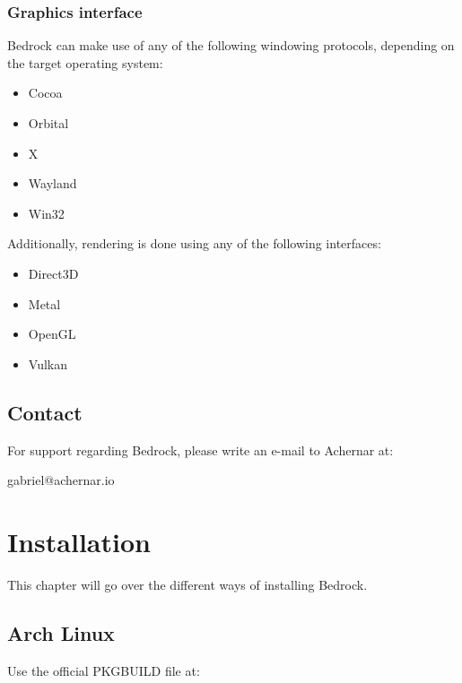 \documentclass[a5paper, twoside]{report}
\begin{document}
			\subsection{Graphics interface}
				Bedrock can make use of any of the following windowing protocols, depending on the target operating system:

				\begin{multicols}{2}
					\begin{itemize}
						\item{Cocoa}
						\item{Orbital}
						\item{X}
						\item{Wayland}
						\item{Win32}
					\end{itemize}
				\end{multicols}

				Additionally, rendering is done using any of the following interfaces:

				\begin{multicols}{2}
					\begin{itemize}
						\item{Direct3D}
						\item{Metal}
						\item{OpenGL}
						\item{Vulkan}
					\end{itemize}
				\end{multicols}

		\section{Contact}
			For support regarding Bedrock, please write an e-mail to Achernar at:

			\begin{mdframed}
				\ttfamily
				gabriel@achernar.io
			\end{mdframed}

	\clearpage
	\chapter{Installation}
		This chapter will go over the different ways of installing Bedrock.

		\section{Arch Linux}
			Use the official PKGBUILD file at:
\end{document}
